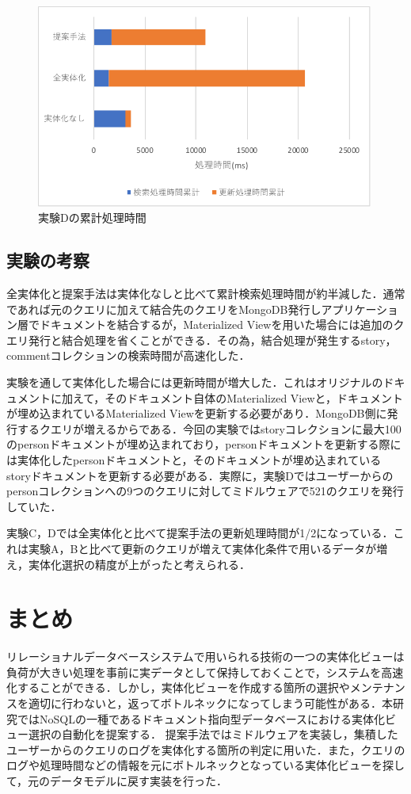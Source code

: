 \documentclass[a4paper,11pt]{ujreport}
\begin{document}
\begin{figure}[htbp]
	\begin{center}
		\includegraphics[width=30em]{src/ExperimentD-total.pdf} %
	\end{center}
	\caption{実験Dの累計処理時間}
	\label{ExperimentD-total}
\end{figure}

\section{実験の考察}
\label{sec:Consideration}
全実体化と提案手法は実体化なしと比べて累計検索処理時間が約半減した．通常であれば元のクエリに加えて結合先のクエリをMongoDB発行しアプリケーション層でドキュメントを結合するが，Materialized Viewを用いた場合には追加のクエリ発行と結合処理を省くことができる．その為，結合処理が発生するstory，commentコレクションの検索時間が高速化した．

実験を通して実体化した場合には更新時間が増大した．これはオリジナルのドキュメントに加えて，そのドキュメント自体のMaterialized Viewと，ドキュメントが埋め込まれているMaterialized Viewを更新する必要があり．MongoDB側に発行するクエリが増えるからである．今回の実験ではstoryコレクションに最大100のpersonドキュメントが埋め込まれており，personドキュメントを更新する際には実体化したpersonドキュメントと，そのドキュメントが埋め込まれているstoryドキュメントを更新する必要がある．実際に，実験Dではユーザーからのpersonコレクションへの9つのクエリに対してミドルウェアで521のクエリを発行していた．

実験C，Dでは全実体化と比べて提案手法の更新処理時間が1/2になっている．これは実験A，Bと比べて更新のクエリが増えて実体化条件で用いるデータが増え，実体化選択の精度が上がったと考えられる．


\chapter{まとめ}
\label{chap:Conclusion}
リレーショナルデータベースシステムで用いられる技術の一つの実体化ビューは負荷が大きい処理を事前に実データとして保持しておくことで，システムを高速化することができる．しかし，実体化ビューを作成する箇所の選択やメンテナンスを適切に行わないと，返ってボトルネックになってしまう可能性がある．本研究ではNoSQLの一種であるドキュメント指向型データベースにおける実体化ビュー選択の自動化を提案する．
提案手法ではミドルウェアを実装し，集積したユーザーからのクエリのログを実体化する箇所の判定に用いた．また，クエリのログや処理時間などの情報を元にボトルネックとなっている実体化ビューを探して，元のデータモデルに戻す実装を行った．
\end{document}
